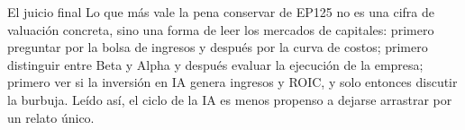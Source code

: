 \begin{importantbox}{El juicio final}
Lo que más vale la pena conservar de EP125 no es una cifra de valuación concreta, sino una forma de leer los mercados de capitales: primero preguntar por la bolsa de ingresos y después por la curva de costos; primero distinguir entre Beta y Alpha y después evaluar la ejecución de la empresa; primero ver si la inversión en IA genera ingresos y ROIC, y solo entonces discutir la burbuja. Leído así, el ciclo de la IA es menos propenso a dejarse arrastrar por un relato único.
\end{importantbox}


